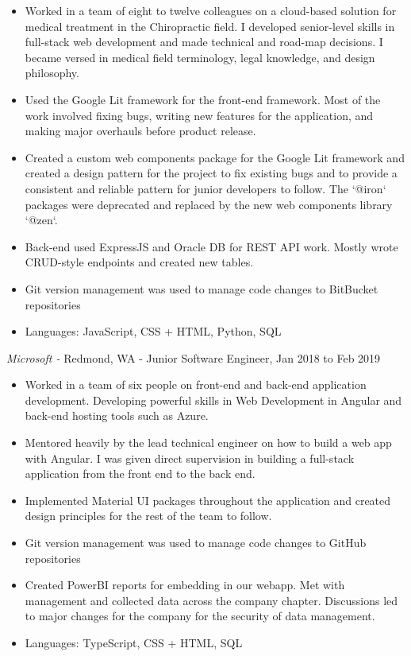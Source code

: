 \documentclass[a4paper,10pt]{article}
\begin{document}
        \begin{itemize}
            \item Worked in a team of eight to twelve colleagues on a cloud-based solution for medical treatment in the Chiropractic field. I developed senior-level skills in full-stack web development and made technical and road-map decisions. I became versed in medical field terminology, legal knowledge, and design philosophy.
            \item Used the Google Lit framework for the front-end framework. Most of the work involved fixing bugs, writing new features for the application, and making major overhauls before product release.
            \item Created a custom web components package for the Google Lit framework and created a design pattern for the project to fix existing bugs and to provide a consistent and reliable pattern for junior developers to follow. The `@iron` packages were deprecated and replaced by the new web components library `@zen`.
            \item Back-end used ExpressJS and Oracle DB for REST API work. Mostly wrote CRUD-style endpoints and created new tables.
            \item Git version management was used to manage code changes to BitBucket repositories
            \item Languages: JavaScript, CSS + HTML, Python, SQL
        \end{itemize}	
    {\sl Microsoft -}{ Redmond, WA - Junior Software Engineer, Jan 2018 to Feb 2019}
        \begin{itemize}
            \item Worked in a team of six people on front-end and back-end application development. Developing powerful skills in Web Development in Angular and back-end hosting tools such as Azure.
            \item Mentored heavily by the lead technical engineer on how to build a web app with Angular. I was given direct supervision in building a full-stack application from the front end to the back end.
            \item Implemented Material UI packages throughout the application and created design principles for the rest of the team to follow.
            \item Git version management was used to manage code changes to GitHub repositories
            \item Created PowerBI reports for embedding in our webapp. Met with management and collected data across the company chapter. Discussions led to major changes for the company for the security of data management.
            \item Languages: TypeScript, CSS + HTML, SQL
        \end{itemize}	
\end{document}
